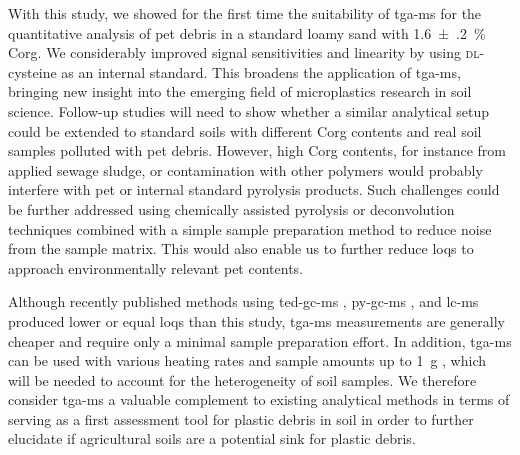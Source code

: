 With this study, we showed for the first time the suitability of \ac{tga-ms} for the quantitative analysis of \ac{pet} debris in a standard loamy sand with \SI{1.6(2)}{\percent} \ac{Corg}. We considerably improved signal sensitivities and linearity by using \textsc{dl}-cysteine as an internal standard. This broadens the application of \ac{tga-ms}, bringing new insight into the emerging field of microplastics research in soil science. Follow-up studies will need to show whether a similar analytical setup could be extended to standard soils with different \ac{Corg} contents and real soil samples polluted with \ac{pet} debris. However, high \ac{Corg} contents, for instance from applied sewage sludge, or contamination with other polymers would probably interfere with \ac{pet} or internal standard pyrolysis products. Such challenges could be further addressed using chemically assisted pyrolysis or deconvolution techniques combined with a simple sample preparation method to reduce noise from the sample matrix. This would also enable us to further reduce \acp{loq} to approach environmentally relevant \ac{pet} contents.

Although recently published methods using \ac{ted-gc-ms} \citep{DumichenAnalysis2015}, \ac{py-gc-ms} \citep{FischerSimultaneous2017}, and \ac{lc-ms} \citep{WangSimple2017} produced lower or equal \acp{loq} than this study, \ac{tga-ms} measurements are generally cheaper and require only a minimal sample preparation effort. In addition, \ac{tga-ms} can be used with various heating rates and sample amounts up to \SI{1}{\gram} \citep{JakabThermal2003}, which will be needed to account for the heterogeneity of soil samples.
We therefore consider \ac{tga-ms} a valuable complement to existing analytical methods in terms of serving as a first assessment tool for plastic debris in soil in order to further elucidate if agricultural soils are a potential sink for plastic debris.
